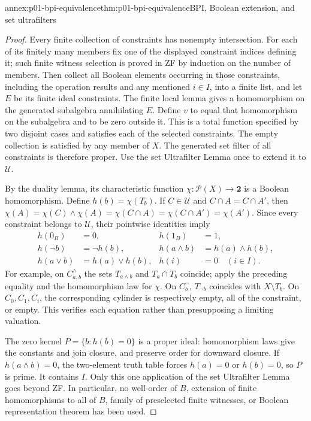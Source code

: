 \begin{annexitem}{annex:p01-bpi-equivalence}{thm:p01-bpi-equivalence}{BPI, Boolean extension, and set ultrafilters}
\begin{proof}
Every finite collection of constraints has nonempty intersection.
For each of its finitely many members fix one of the displayed constraint
indices defining it; such finite witness selection is proved in ZF by
induction on the number of members. Then collect all Boolean elements
occurring in those constraints,
including the operation results and any mentioned \(i\in I\), into
a finite list, and let \(E\) be its finite ideal constraints. The
finite local lemma gives a homomorphism on the generated subalgebra
annihilating \(E\). Define \(v\) to equal that homomorphism on the
subalgebra and to be zero outside it. This is a total function specified
by two disjoint cases and satisfies each of the selected constraints.
The empty collection is satisfied by any member of \(X\).
The generated set filter of all constraints is therefore proper.
Use the set Ultrafilter Lemma once to extend it to \(\mathcal U\).

By the duality lemma, its characteristic function
\(\chi:\mathcal P(X)\to\mathbf2\) is a Boolean homomorphism.
Define \(h(b)=\chi(T_b)\). If \(C\in\mathcal U\) and
\(C\cap A=C\cap A'\), then
\(\chi(A)=\chi(C)\wedge\chi(A)=\chi(C\cap A)
=\chi(C\cap A')=\chi(A')\).
Since every constraint belongs to \(\mathcal U\), their pointwise
identities imply
\[
\begin{aligned}
 h(0_B)&=0,& h(1_B)&=1,\\
 h(\neg b)&=\neg h(b),& h(a\wedge b)&=h(a)\wedge h(b),\\
 h(a\vee b)&=h(a)\vee h(b),& h(i)&=0\quad(i\in I).
\end{aligned}
\]
For example, on \(C^{\wedge}_{a,b}\) the sets
\(T_{a\wedge b}\) and \(T_a\cap T_b\) coincide; apply the preceding
equality and the homomorphism law for \(\chi\). On \(C^{\neg}_b\),
\(T_{\neg b}\) coincides with \(X\setminus T_b\). On \(C_0,C_1,C_i\),
the corresponding cylinder is respectively empty, all of the constraint,
or empty. This verifies each equation rather than presupposing a limiting
valuation.

The zero kernel \(P=\{b:h(b)=0\}\) is a proper ideal: homomorphism
laws give the constants and join closure, and preserve order for downward
closure. If \(h(a\wedge b)=0\), the two-element truth table forces
\(h(a)=0\) or \(h(b)=0\), so \(P\) is prime. It contains \(I\).
Only this one application of the set Ultrafilter Lemma goes beyond ZF.
In particular, no well-order of \(B\), extension of finite homomorphisms
to all of \(B\), family of preselected finite witnesses, or Boolean
representation theorem has been used.
\end{proof}
\end{annexitem}

